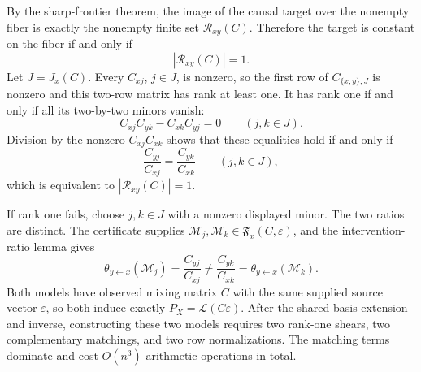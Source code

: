 By the sharp-frontier theorem, the image of the causal target over the nonempty fiber is exactly the nonempty finite set \(\mathcal R_{xy}(C)\). Therefore the target is constant on the fiber if and only if
\[
 |\mathcal R_{xy}(C)|=1.
\]
Let \(J=J_x(C)\). Every \(C_{xj}\), \(j\in J\), is nonzero, so the first row of \(C_{\{x,y\},J}\) is nonzero and this two-row matrix has rank at least one. It has rank one if and only if all its two-by-two minors vanish:
\[
 C_{xj}C_{yk}-C_{xk}C_{yj}=0
 \qquad(j,k\in J).
\]
Division by the nonzero \(C_{xj}C_{xk}\) shows that these equalities hold if and only if
\[
 \frac{C_{yj}}{C_{xj}}=\frac{C_{yk}}{C_{xk}}
 \qquad(j,k\in J),
\]
which is equivalent to \(|\mathcal R_{xy}(C)|=1\).

If rank one fails, choose \(j,k\in J\) with a nonzero displayed minor. The two ratios are distinct. The certificate supplies \(\mathcal M_j,\mathcal M_k\in\mathfrak F_x(C,\varepsilon)\), and the intervention-ratio lemma gives
\[
 \theta_{y\leftarrow x}(\mathcal M_j)=\frac{C_{yj}}{C_{xj}}
 \ne \frac{C_{yk}}{C_{xk}}
 =\theta_{y\leftarrow x}(\mathcal M_k).
\]
Both models have observed mixing matrix \(C\) with the same supplied source vector \(\varepsilon\), so both induce exactly \(P_X=\mathcal L(C\varepsilon)\). After the shared basis extension and inverse, constructing these two models requires two rank-one shears, two complementary matchings, and two row normalizations. The matching terms dominate and cost \(O(n^3)\) arithmetic operations in total.